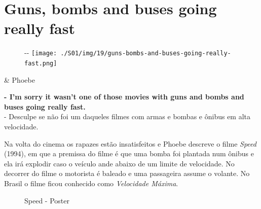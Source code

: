 \hypertarget{guns-bombs-and-buses-going-really-fast}{%
\section{Guns, bombs and buses going really
fast}\label{guns-bombs-and-buses-going-really-fast}}

\begin{figure}[!ht]
  \begin{adjustwidth}{-\oddsidemargin-1in}{-\rightmargin}
    \centering
    \texttt{[image: ./S01/img/19/guns-bombs-and-buses-going-really-fast.png]}
  \end{adjustwidth}
\end{figure}

\begin{tcolorbox}[enhanced,center upper,
    drop fuzzy shadow southeast, boxrule=0.3pt,
    lower separated=false, breakable,
    colframe=black!30!dialogoBorder,colback=white]
\begin{minipage}[c]{0.16\linewidth}
   & \centering \scriptsize{Phoebe}
\end{minipage}
\hfill
\begin{minipage}[c]{0.8\linewidth}
  \textbf{- I'm sorry it wasn't one of those movies with guns and bombs and buses going really fast.}\\
  - Desculpe se não foi um daqueles filmes com armas e bombas e ônibus em alta velocidade.
\end{minipage}
\end{tcolorbox}

Na volta do cinema os rapazes estão insatisfeitos e Phoebe descreve o
filme \emph{Speed} (1994), em que a premissa do filme é que uma bomba
foi plantada num ônibus e ela irá explodir caso o veículo ande abaixo de
um limite de velocidade. No decorrer do filme o motorista é baleado e
uma passageira assume o volante. No Brasil o filme ficou conhecido como
\emph{Velocidade Máxima}.

\begin{figure}
  \centering
    \caption{Speed - Poster\label{fig:speed-poster}}
\end{figure}

